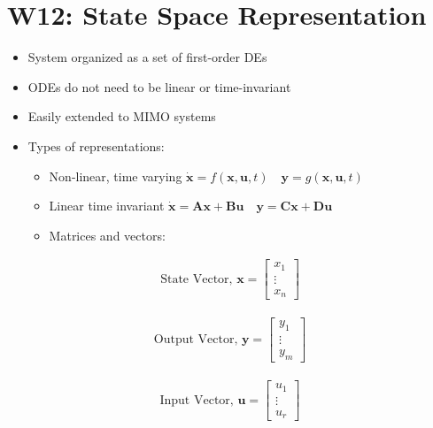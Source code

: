 \documentclass[a4paper]{article}
\begin{document}
\newpage
\section{W12: State Space Representation}
\begin{itemize}
    \item System organized as a set of first-order DEs
    \item ODEs do not need to be linear or time-invariant 
    \item Easily extended to MIMO systems
    \item Types of representations:
    \begin{itemize}[label=$\circ$]
        \item Non-linear, time varying \quad $\mathbf{\dot{x}}= f(\mathbf{x}, \mathbf{u}, t)\quad \mathbf{y} = g(\mathbf{x}, \mathbf{u}, t)$
        \item Linear time invariant \quad $\mathbf{\dot{x}} = \mathbf{Ax}+\mathbf{Bu} \quad \mathbf{y} = \mathbf{Cx}+\mathbf{Du}$
        \item Matrices and vectors:
    \end{itemize}
\end{itemize}
\begin{minipage}{0.33\textwidth}
\begin{align*}
    \text{State Vector, }\mathbf{x} = 
    \begin{bmatrix}
    x_1\\ \vdots\\ x_n
    \end{bmatrix}
\end{align*}
\end{minipage}
\begin{minipage}{0.34\textwidth}
\begin{align*}
    \text{Output Vector, }\mathbf{y} =
    \begin{bmatrix}
    y_1\\ \vdots\\ y_m
    \end{bmatrix}
\end{align*}
\end{minipage}
\begin{minipage}{0.33\textwidth}
\begin{align*}
    \text{Input Vector, }\mathbf{u} =
    \begin{bmatrix}
    u_1\\ \vdots\\ u_r
    \end{bmatrix}
\end{align*}
\end{minipage}
\end{document}
